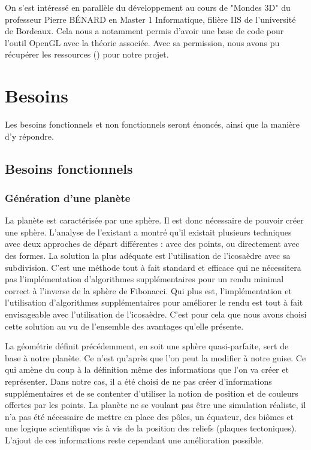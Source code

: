\documentclass[a4paper]{article}
\begin{document}
    On s'est intéressé en parallèle du développement au cours de "Mondes 3D" du professeur Pierre BÉNARD en Master 1 Informatique, filière IIS de l'université de Bordeaux. Cela nous a notamment permis d'avoir une base de code pour l'outil OpenGL avec la théorie associée. Avec sa permission, nous avons pu récupérer les ressources (\cite{TD_3D}) pour notre projet.

\newpage 
\section{Besoins}

Les besoins fonctionnels et non fonctionnels seront énoncés, ainsi que la manière d'y répondre.

\subsection{Besoins fonctionnels}

\subsubsection{Génération d'une planète}

\label{geo_planet}
La planète est caractérisée par une sphère. Il est donc nécessaire de pouvoir créer une sphère. L’analyse de l’existant a montré qu’il existait plusieurs techniques avec deux approches de départ différentes : avec des points, ou directement avec des formes. La solution la plus adéquate est l’utilisation de l’icosaèdre avec sa subdivision. C’est une méthode tout à fait standard et efficace qui ne nécessitera pas l’implémentation d’algorithmes supplémentaires pour un rendu minimal correct à l’inverse de la sphère de Fibonacci. Qui plus est, l’implémentation et l’utilisation d’algorithmes supplémentaires pour améliorer le rendu est tout à fait envisageable avec l’utilisation de l’icosaèdre. C'est pour cela que nous avons choisi cette solution au vu de l'ensemble des avantages qu'elle présente.

La géométrie définit précédemment, en soit une sphère quasi-parfaite, sert de base à notre planète. Ce n’est qu'après que l'on peut la modifier à notre guise. Ce qui amène du coup à la définition même des informations que l’on va créer et représenter. Dans notre cas, il a été choisi de ne pas créer d'informations supplémentaires et de se contenter d'utiliser la notion de position et de couleurs offertes par les points. La planète ne se voulant pas être une simulation réaliste, il n'a pas été nécessaire de mettre en place des pôles, un équateur, des biômes et une logique scientifique vis à vis de la position des reliefs (plaques tectoniques). L'ajout de ces informations reste cependant une amélioration possible.
\end{document}
